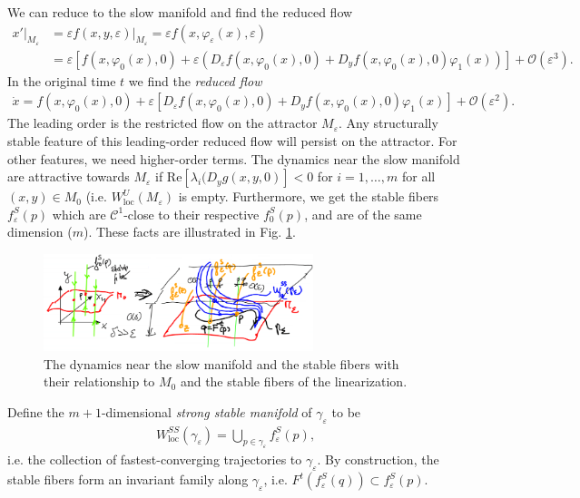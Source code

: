 We can reduce to the slow manifold and find the reduced flow
\begin{align}
	\left. x' \right|_{M_{\varepsilon}} &= \varepsilon\left. f(x,y, \varepsilon)\right|_{M_{\varepsilon }}	= \varepsilon f(x, \varphi_\varepsilon(x), \varepsilon) \\
					    &= \varepsilon \left[ f(x, \varphi_0 (x) , 0) + \varepsilon\left( D_{\varepsilon} f(x, \varphi_0(x), 0) + D_{y}f(x, \varphi_0 (x), 0) \varphi_1(x) \right) \right] + \mathcal{O}(\varepsilon ^{3}).
\end{align}
In the original time $t$ we find the \emph{reduced flow}
\begin{align}
	\boxed{
		\dot{x} = f(x, \varphi_0(x), 0) + \varepsilon \left[ D_{\varepsilon}f(x, \varphi_0(x), 0) + D_{y} f(x, \varphi_0(x), 0) \varphi_1(x) \right] + \mathcal{O}(\varepsilon^{2}).
	}
\end{align}
The leading order is the restricted flow on the attractor $M_{\varepsilon}$. Any structurally stable feature of this leading-order reduced flow will persist on the attractor. For other features, we need higher-order terms. The dynamics near the slow manifold are attractive towards $M_{\varepsilon}$ if $ \textrm{Re} [\lambda_i ( D_{y}g(x,y,0)]<0$ for $i=1, \ldots, m$ for all $(x,y) \in M_0$ (i.e. $W^{U}_{ \textrm{loc} }(M_{\varepsilon})$ is empty. Furthermore, we get the stable fibers $f_{\varepsilon}^{S}(p)$ which are $\mathcal{C}^{1}$-close to their respective $f_{0}^{S}(p)$, and are of the same dimension ($m$). These facts are illustrated in Fig. \ref{fig:perturbed_features}.

\begin{figure}[h!]
	\centering
	\includegraphics[width=0.7\textwidth]{figures/ch9/19perturbed_features.png}
	\caption{The dynamics near the slow manifold and the stable fibers with their relationship to $M_0$ and the stable fibers of the linearization.}
	\label{fig:perturbed_features}
\end{figure}

Define the $m+1$-dimensional \emph{strong stable manifold} of $\gamma_{\varepsilon}$ to be
\begin{align}
	W_{ \textrm{loc} }^{SS}(\gamma_{\varepsilon}) = \bigcup_{p \in \gamma_{\varepsilon}}f_{\varepsilon}^{S}(p),
\end{align}
i.e. the collection of fastest-converging trajectories to $\gamma_\varepsilon$. By construction, the stable fibers form an invariant family along $\gamma_{\varepsilon}$, i.e. $F^{t}(f^{S}_{\varepsilon}(q)) \subset f^{S}_{\varepsilon}(p)$.

